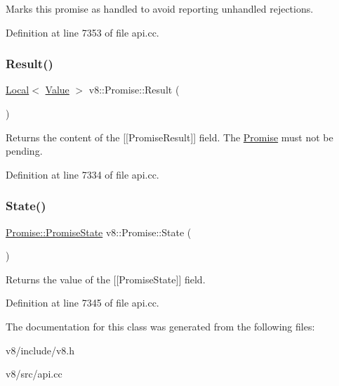 Marks this promise as handled to avoid reporting unhandled rejections. 

Definition at line 7353 of file api.\+cc.

\mbox{\label{classv8_1_1Promise_a81327dabe172ce53ce0e8f2033763ac2}} 
\subsubsection{\texorpdfstring{Result()}{Result()}}
{\footnotesize\ttfamily \mbox{\hyperlink{classv8_1_1Local}{Local}}$<$ \mbox{\hyperlink{classv8_1_1Value}{Value}} $>$ v8\+::\+Promise\+::\+Result (\begin{DoxyParamCaption}{ }\end{DoxyParamCaption})}

Returns the content of the \mbox{[}\mbox{[}Promise\+Result\mbox{]}\mbox{]} field. The \mbox{\hyperlink{classv8_1_1Promise}{Promise}} must not be pending. 

Definition at line 7334 of file api.\+cc.

\mbox{\label{classv8_1_1Promise_a0eaacfd366a0c22be445681ec97412be}} 
\subsubsection{\texorpdfstring{State()}{State()}}
{\footnotesize\ttfamily \mbox{\hyperlink{classv8_1_1Promise_a0c357b9d99a634f98a5a203b0a322544}{Promise\+::\+Promise\+State}} v8\+::\+Promise\+::\+State (\begin{DoxyParamCaption}{ }\end{DoxyParamCaption})}

Returns the value of the \mbox{[}\mbox{[}Promise\+State\mbox{]}\mbox{]} field. 

Definition at line 7345 of file api.\+cc.



The documentation for this class was generated from the following files\+:\begin{DoxyCompactItemize}
\item 
v8/include/v8.\+h\item 
v8/src/api.\+cc\end{DoxyCompactItemize}
